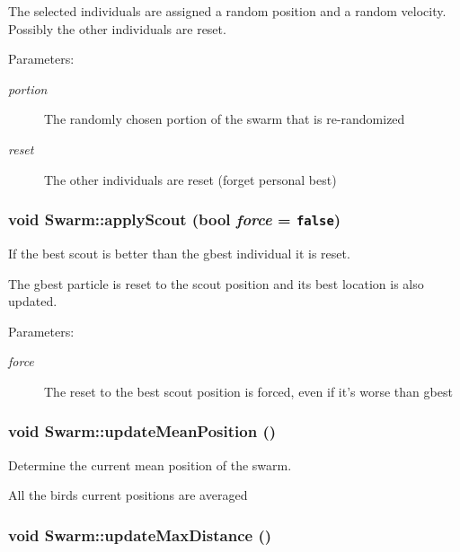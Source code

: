 The selected individuals are assigned a random position and a random velocity. Possibly the other individuals are reset. \begin{Desc}
\item[Parameters:]
\begin{description}
\item[{\em portion}]The randomly chosen portion of the swarm that is re-randomized \item[{\em reset}]The other individuals are reset (forget personal best) \end{description}
\end{Desc}
\hypertarget{classSwarm_8315401d37a75266d77f71a66660d1ae}{
\subsubsection{\setlength{\rightskip}{0pt plus 5cm}void Swarm::applyScout (bool {\em force} = {\tt false})}}
\label{classSwarm_8315401d37a75266d77f71a66660d1ae}


If the best scout is better than the gbest individual it is reset. 

The gbest particle is reset to the scout position and its best location is also updated. \begin{Desc}
\item[Parameters:]
\begin{description}
\item[{\em force}]The reset to the best scout position is forced, even if it's worse than gbest \end{description}
\end{Desc}
\hypertarget{classSwarm_40a832e5094cc0bef13d9c6ab83b98c5}{
\subsubsection{\setlength{\rightskip}{0pt plus 5cm}void Swarm::updateMeanPosition ()}}
\label{classSwarm_40a832e5094cc0bef13d9c6ab83b98c5}


Determine the current mean position of the swarm. 

All the birds current positions are averaged \hypertarget{classSwarm_5ef674f56c0bb5276aab56f456bd16b4}{
\subsubsection{\setlength{\rightskip}{0pt plus 5cm}void Swarm::updateMaxDistance ()}}
\label{classSwarm_5ef674f56c0bb5276aab56f456bd16b4}


